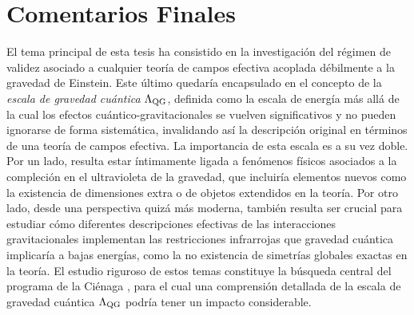 





\chapter*{Comentarios Finales}
\thispagestyle{simple}

El tema principal de esta tesis ha consistido en la investigación del régimen de validez asociado a cualquier teoría de campos efectiva acoplada débilmente a la gravedad de Einstein. Este último quedaría encapsulado en el concepto de la \emph{escala de gravedad cuántica} $\Lambda_{\text{QG}}$, definida como la escala de energía más allá de la cual los efectos cuántico-gravitacionales se vuelven significativos y no pueden ignorarse de forma sistemática, invalidando así la descripción original en términos de una teoría de campos efectiva. La importancia de esta escala es a su vez doble. Por un lado, resulta estar íntimamente ligada a fenómenos físicos asociados a la compleción en el ultravioleta de la gravedad, que incluiría elementos nuevos como la existencia de dimensiones extra o de objetos extendidos en la teoría. Por otro lado, desde una perspectiva quizá más moderna, también resulta ser crucial para estudiar cómo diferentes descripciones efectivas de las interacciones gravitacionales implementan las restricciones infrarrojas que gravedad cuántica implicaría a bajas energías, como la no existencia de simetrías globales exactas en la teoría. El estudio riguroso de estos temas constituye la búsqueda central del programa de la Ciénaga \cite{Vafa:2005ui}, para el cual una comprensión detallada de la escala de gravedad cuántica $\Lambda_{\text{QG}}$ podría tener un impacto considerable.

